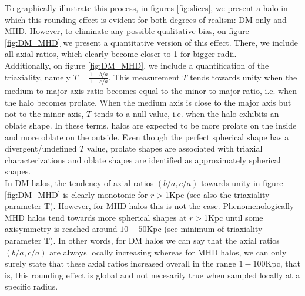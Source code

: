 To graphically illustrate this process, in figures \ref{fig:slices}, we present a halo in which this rounding effect is evident for both degrees of realism: DM-only and MHD. However, to eliminate any possible qualitative bias, on figure \ref{fig:DM_MHD} we present a quantitative version of this effect. There, we include all axial ratios, which clearly become closer to 1 for bigger radii. \\

Additionally, on figure \ref{fig:DM_MHD}, we include a quantification of the triaxiality, namely $T=\frac{1-b/a}{1-c/a}$. This measurement $T$ tends towards unity when the medium-to-major axis ratio becomes equal to the minor-to-major ratio, i.e. when the halo becomes prolate. When the medium axis is close to the major axis but not to the minor axis, $T$ tends to a null value, i.e. when the halo exhibits an oblate shape. In these terms, halos are expected to be more prolate on the inside and more oblate on the outside. Even though the perfect spherical shape has a divergent/undefined $T$ value, prolate shapes are associated with triaxial characterizations and oblate shapes are identified as approximately spherical shapes. \\

In DM halos, the tendency of axial ratios $(b/a,c/a)$ towards unity in figure \ref{fig:DM_MHD} is clearly monotonic for $r>$1Kpc (see also the triaxiality parameter T). However, for MHD halos this is not the case. Phenomenologically MHD halos tend towards more spherical shapes at $r>$1Kpc until some axisymmetry is reached around $10-50$Kpc (see minimum of triaxiality parameter T). In other words, for DM halos we can say that the axial ratios $(b/a,c/a)$ are always locally increasing whereas for MHD halos, we can only surely state that these axial ratios increased overall in the range $1-100$Kpc, that is, this rounding effect is global and not necesarily true when sampled locally at a specific radius. \\

